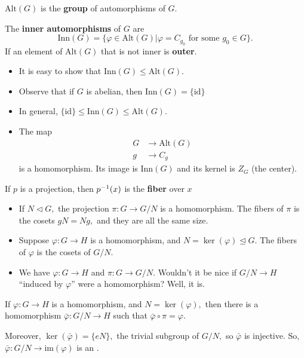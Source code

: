 \documentclass[a4paper]{article}
\begin{document}
\begin{definition}
    $\mathrm{Alt}(G)$ is the \textbf{group} of automorphisms of $G$.
\end{definition}
\begin{definition}
    The \textbf{inner automorphisms} of $G$ are \begin{equation}
        \textrm{Inn}(G)=\{\varphi\in\mathrm{Alt}(G)|\varphi=C_{g_0}\text{ for some }g_0\in G\}.
    \end{equation}
    If an element of $\mathrm{Alt}(G)$ that is not inner is \textbf{outer}.
\end{definition}
\begin{itemize}
    \item It is easy to show that $\mathrm{Inn}(G)\leq\mathrm{Alt}(G).$ 
    \item Observe that if $G$ is abelian, then $\mathrm{Inn}(G)=\{\mathrm{id}\}$
    \item In general, $\{\mathrm{id}\}\leq\mathrm{Inn}(G)\leq\mathrm{Alt}(G).$
\end{itemize}
\begin{itemize}
    \item The map \begin{align}
        G&\to\mathrm{Alt}(G)\\
        g&\to C_g
    \end{align}
    is a homomorphism. Its image is $\mathrm{Inn}(G)$ and its kernel is $Z_G$ (the center).
\end{itemize}
\begin{definition}[Fiber]
    If $p$ is a projection, then $p^{-1}(x)$ is the \textbf{fiber} over $x$
\end{definition}
\begin{itemize}
    \item If $N\triangleleft G,$ the projection $\pi:G\to G/N$ is a homomorphism. The fibers of $\pi$ is the cosets $gN=Ng,$ and they are all the same size.
    \item Suppose $\varphi:G\to H$ is a homomorphism, and $N=\ker(\varphi)\trianglelefteq G.$ The fibers of $\varphi$ is the cosets of $G/N.$
    \item We have $\varphi:G\to H$ and $\pi:G\to G/N.$ Wouldn't it be nice if $G/N\to H$ ``induced by $\varphi$'' were a homomorphism? Well, it is. 
\end{itemize}
\begin{theorem}
    If $\varphi:G\to H$ is a homomorphism, and $N=\ker(\varphi),$ then there is a homomorphism $\bar\varphi:G/N\to H$ such that $\bar\varphi\circ\pi=\varphi.$ 
    
    Moreover, $\ker(\bar\varphi)=\{eN\},$ the trivial subgroup of $G/N,$ so $\bar\varphi$ is injective. So, $\bar\varphi:G/N\to\mathrm{im}(\varphi)$ is an .
\end{theorem}
\end{document}
